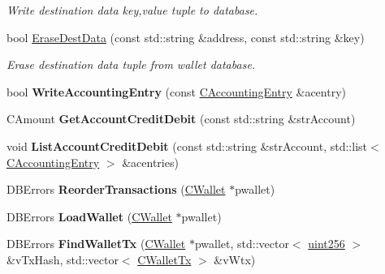 \begin{DoxyCompactItemize}
\begin{DoxyCompactList}\small\item\em Write destination data key,value tuple to database. \end{DoxyCompactList}\item 
\mbox{\label{class_c_wallet_d_b_a0403a98efe565020f8804eefbc808d90}} 
bool \mbox{\hyperlink{class_c_wallet_d_b_a0403a98efe565020f8804eefbc808d90}{Erase\+Dest\+Data}} (const std\+::string \&address, const std\+::string \&key)
\begin{DoxyCompactList}\small\item\em Erase destination data tuple from wallet database. \end{DoxyCompactList}\item 
\mbox{\label{class_c_wallet_d_b_a958a0138b171e213be35f48933adcb89}} 
bool {\bfseries Write\+Accounting\+Entry} (const \mbox{\hyperlink{class_c_accounting_entry}{C\+Accounting\+Entry}} \&acentry)
\item 
\mbox{\label{class_c_wallet_d_b_af924f6275a873e048699e6ef0bf66346}} 
C\+Amount {\bfseries Get\+Account\+Credit\+Debit} (const std\+::string \&str\+Account)
\item 
\mbox{\label{class_c_wallet_d_b_a51555c82291fe16081880110541e207f}} 
void {\bfseries List\+Account\+Credit\+Debit} (const std\+::string \&str\+Account, std\+::list$<$ \mbox{\hyperlink{class_c_accounting_entry}{C\+Accounting\+Entry}} $>$ \&acentries)
\item 
\mbox{\label{class_c_wallet_d_b_ac195547d64e4c0e84be73e245e7d49c8}} 
D\+B\+Errors {\bfseries Reorder\+Transactions} (\mbox{\hyperlink{class_c_wallet}{C\+Wallet}} $\ast$pwallet)
\item 
\mbox{\label{class_c_wallet_d_b_a14f26e53502d1a60dd2b034f830acf03}} 
D\+B\+Errors {\bfseries Load\+Wallet} (\mbox{\hyperlink{class_c_wallet}{C\+Wallet}} $\ast$pwallet)
\item 
\mbox{\label{class_c_wallet_d_b_a7994078fff8bd8b1cc85b2bf0f3ccff3}} 
D\+B\+Errors {\bfseries Find\+Wallet\+Tx} (\mbox{\hyperlink{class_c_wallet}{C\+Wallet}} $\ast$pwallet, std\+::vector$<$ \mbox{\hyperlink{classuint256}{uint256}} $>$ \&v\+Tx\+Hash, std\+::vector$<$ \mbox{\hyperlink{class_c_wallet_tx}{C\+Wallet\+Tx}} $>$ \&v\+Wtx)

\end{DoxyCompactItemize}

